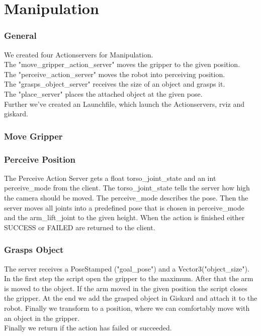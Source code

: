 \documentclass[main.tex]{subfiles}
\begin{document}
	
	\chapter{Manipulation}
	
	\subsection{General}
	We created four Actionservers for Manipulation.\\
	The "move\_gripper\_action\_server" moves the gripper to the given position.\\
	The "perceive\_action\_server" moves the robot into perceiving position.\\
	The "grasps\_object\_server" receives the size of an object and grasps it.\\
	The "place\_server" places the attached object at the given pose.\\
	Further we've created an Launchfile, which launch the Actionservers, rviz and giskard.
	
	
	\vspace{1cm}
	
	\subsection{Move Gripper}
	
	\vspace{1cm}
	
	\subsection{Perceive Position}
	The Perceive Action Server gets a float torso\_joint\_state and an int perceive\_mode from the client. The torso\_joint\_state tells the server how high the camera should be moved. The perceive\_mode describes the pose. Then the server moves all joints into a predefined pose that is chosen in perceive\_mode and the arm\_lift\_joint to the given height. When the action is finished either SUCCESS or FAILED are returned to the client.

	\vspace{1cm}
	
	\subsection{Grasps Object}
	The server receives a PoseStamped ("goal\_pose") and a Vector3("object\_size"). In the first step the script open the gripper to the maximum. After that the arm is moved to the object. If the arm moved in the given position the script closes the gripper. At the end we add the grasped object in Giskard and attach it to the robot. Finally we transform to a position, where we can comfortably move with an object in the gripper.\\
	Finally we return if the action has failed or succeeded.
	
\end{document}
